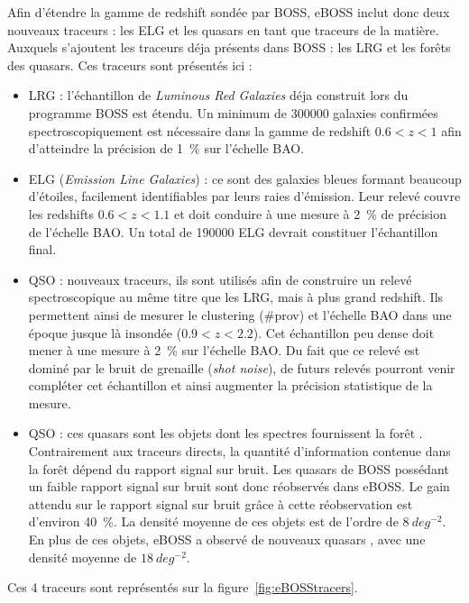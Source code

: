 Afin d'étendre la gamme de redshift sondée par BOSS, eBOSS inclut donc deux nouveaux traceurs : les ELG et les quasars en tant que traceurs de la matière. Auxquels s'ajoutent les traceurs déja présents dans BOSS : les LRG et les forêts \lya{} des quasars. Ces traceurs sont présentés ici :
\begin{itemize}
\item LRG : l'échantillon de \emph{Luminous Red Galaxies} déja construit lors du programme BOSS est étendu. Un minimum de \num{300000} galaxies confirmées spectroscopiquement est nécessaire dans la gamme de redshift $\num{0,6} < z < \num{1}$ afin d'atteindre la précision de \SI{1}{\percent} sur l'échelle BAO.
\item ELG (\emph{Emission Line Galaxies}) : ce sont des galaxies bleues formant beaucoup d'étoiles, facilement identifiables par leurs raies d'émission. Leur relevé couvre les redshifts $\num{0,6} < z < \num{1,1}$ et doit conduire à une mesure à \SI{2}{\percent} de précision de l'échelle BAO. Un total de \num{190000} ELG devrait constituer l'échantillon final.
\item QSO : nouveaux traceurs, ils sont utilisés afin de construire un relevé spectroscopique au même titre que les LRG, mais à plus grand redshift. Ils permettent ainsi de mesurer le clustering (\#prov) et l'échelle BAO dans une époque jusque là insondée ($\num{0,9} < z < \num{2,2}$). Cet échantillon peu dense doit mener à une mesure à \SI{2}{\percent} sur l'échelle BAO. Du fait que ce relevé est dominé par le bruit de grenaille (\emph{shot noise}), de futurs relevés pourront venir compléter cet échantillon et ainsi augmenter la précision statistique de la mesure.
\item \lya{} QSO : ces quasars sont les objets dont les spectres fournissent la forêt \lya{}. Contrairement aux traceurs directs, la quantité d'information contenue dans la forêt \lya{} dépend du rapport signal sur bruit. Les quasars \lya{} de BOSS possédant un faible rapport signal sur bruit sont donc réobservés dans eBOSS. Le gain attendu sur le rapport signal sur bruit grâce à cette réobservation est d'environ \SI{40}{\percent}. La densité moyenne de ces objets est de l'ordre de $\SI{8}{deg^{-2}}$. \\
  En plus de ces objets, eBOSS a observé de nouveaux quasars \lya{}, avec une densité moyenne de $\SI{18}{deg^{-2}}$.
\end{itemize}
Ces 4 traceurs sont représentés sur la figure~\ref{fig:eBOSStracers}.
